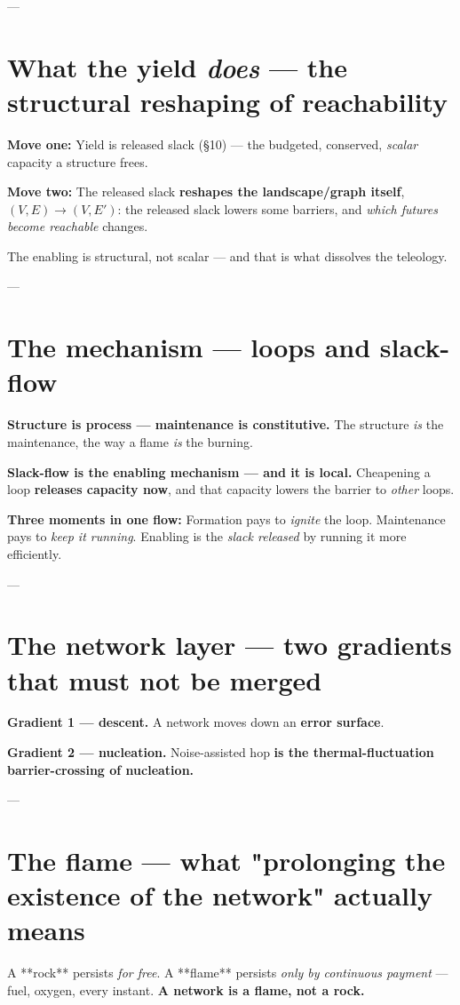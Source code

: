 \documentclass{article}
\begin{document}
---
\section{What the yield \textit{does} --- the structural reshaping of reachability}
\textbf{Move one:} Yield is released slack (§10) --- the budgeted, conserved, \textit{scalar} capacity a structure frees.

\textbf{Move two:} The released slack \textbf{reshapes the landscape/graph itself}, $(V, E) \rightarrow (V, E')$: the released slack lowers some barriers, and \textit{which futures become reachable} changes.

The enabling is structural, not scalar --- and that is what dissolves the teleology.

---
\section{The mechanism --- loops and slack-flow}
\textbf{Structure is process --- maintenance is constitutive.} The structure \textit{is} the maintenance, the way a flame \textit{is} the burning.

\textbf{Slack-flow is the enabling mechanism --- and it is local.} Cheapening a loop \textbf{releases capacity now}, and that capacity lowers the barrier to \textit{other} loops.

\textbf{Three moments in one flow:} Formation pays to \textit{ignite} the loop. Maintenance pays to \textit{keep it running}. Enabling is the \textit{slack released} by running it more efficiently.

---
\section{The network layer --- two gradients that must not be merged}
\textbf{Gradient 1 --- descent.} A network moves down an \textbf{error surface}.

\textbf{Gradient 2 --- nucleation.} Noise-assisted hop \textbf{is the thermal-fluctuation barrier-crossing of nucleation.}

---
\section{The flame --- what "prolonging the existence of the network" actually means}
A **rock** persists \textit{for free}. A **flame** persists \textit{only by continuous payment} --- fuel, oxygen, every instant. \textbf{A network is a flame, not a rock.}
\end{document}
